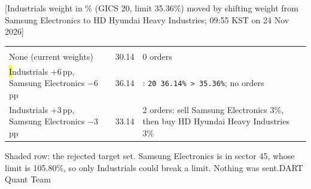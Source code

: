 [Industrials weight in \% (GICS 20, limit 35.36\%) moved by shifting weight from Samsung Electronics to HD Hyundai Heavy Industries; 09:55 KST on 24 Nov 2026]{%
{\tabfont\begin{tabularx}{\linewidth}{>{\RaggedRight\arraybackslash}p{58mm} R{15mm} >{\RaggedRight\arraybackslash\leftskip=8pt}X}
 &  & \\
None (current weights) & 30.14 & 0 orders\\\rowsep
\hl Industrials +6\,pp, Samsung Electronics $-$6\,pp & 36.14 & : \texttt{20 36.14\% > 35.36\%}; no orders\\\rowsep
Industrials +3\,pp, Samsung Electronics $-$3\,pp & 33.14 & 2 orders: sell Samsung Electronics 3\%, then buy HD Hyundai Heavy Industries 3\%\\
\end{tabularx}}}{Shaded row: the rejected target set. Samsung Electronics is in sector 45, whose limit is 105.80\%, so only Industrials could break a limit. Nothing was sent.}{DART Quant Team}
